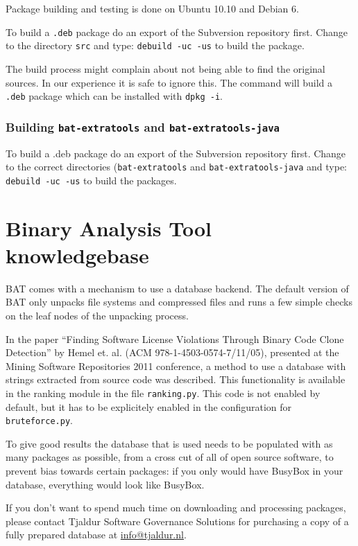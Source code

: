 \documentclass[10pt]{article}
\begin{document}
Package building and testing is done on Ubuntu 10.10 and Debian 6.

To build a \texttt{.deb} package do an export of the Subversion repository
first.  Change to the directory \texttt{src} and type:
\texttt{debuild -uc -us} to build the package.

The build process might complain about not being able to find the original
sources. In our experience it is safe to ignore this. The command will build a
\texttt{.deb} package which can be installed with \texttt{dpkg -i}.

\subsubsection{Building \texttt{bat-extratools} and
\texttt{bat-extratools-java}}

To build a .deb package do an export of the Subversion repository first. Change
to the correct directories (\texttt{bat-extratools} and 
\texttt{bat-extratools-java} and type: \texttt{debuild -uc -us} to
build the packages.

\section{Binary Analysis Tool knowledgebase}

BAT comes with a mechanism to use a database backend. The default version of
BAT only unpacks file systems and compressed files and runs a few simple checks
on the leaf nodes of the unpacking process.

In the paper ``Finding Software License Violations Through Binary Code Clone
Detection'' by Hemel et. al. (ACM 978-1-4503-0574-7/11/05), presented at
the Mining Software Repositories 2011 conference, a method to use a database
with strings extracted from source code was described. This functionality is
available in the ranking module in the file \texttt{ranking.py}. This code
is not enabled by default, but it has to be explicitely enabled in the
configuration for \texttt{bruteforce.py}.

To give good results the database that is used needs to be populated with as
many packages as possible, from a cross cut of all of open source software, to
prevent bias towards certain packages: if you only would have BusyBox in your
database, everything would look like BusyBox.

If you don't want to spend much time on downloading and processing
packages, please contact Tjaldur Software Governance Solutions for
purchasing a copy of a fully prepared database at \url{info@tjaldur.nl}.
\end{document}
